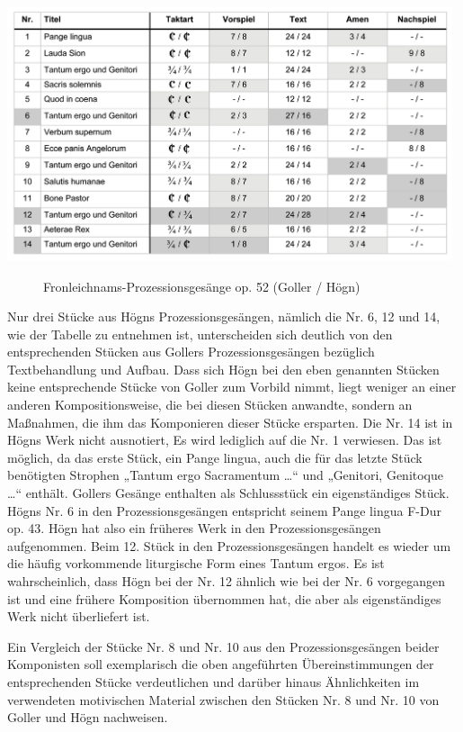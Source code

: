 {%
\includegraphics[width=13.088cm,height=7.486cm]{pictures/zulassungsarbeit-img082.png}
 \par}

\begin{figure}
\caption{Fronleichnams-Prozessionsgesänge op. 52 (Goller / Högn)}
\end{figure}

Nur drei Stücke aus Högns Prozessionsgesängen, nämlich die Nr. 6, 12 und
14, wie der Tabelle zu entnehmen ist, unterscheiden sich deutlich von
den entsprechenden Stücken aus Gollers Prozessionsgesängen bezüglich
Textbehandlung und Aufbau. Dass sich Högn bei den eben genannten
Stücken keine entsprechende Stücke von Goller zum Vorbild nimmt, liegt
weniger an einer anderen Kompositionsweise, die bei diesen Stücken
anwandte, sondern an Maßnahmen, die ihm das Komponieren dieser Stücke
ersparten. Die Nr. 14 ist in Högns Werk nicht ausnotiert, Es wird
lediglich auf die Nr. 1 verwiesen. Das ist möglich, da das erste Stück,
ein Pange lingua, auch die für das letzte Stück benötigten Strophen
„Tantum ergo Sacramentum …“ und „Genitori, Genitoque …“ enthält.
Gollers Gesänge enthalten als Schlussstück ein eigenständiges Stück.
Högns Nr. 6 in den Prozessionsgesängen entspricht seinem Pange lingua
F-Dur op. 43. Högn hat also ein früheres Werk in den
Prozessionsgesängen aufgenommen. Beim 12. Stück in den
Prozessionsgesängen handelt es wieder um die häufig vorkommende
liturgische Form eines Tantum ergos. Es ist wahrscheinlich, dass Högn
bei der Nr. 12 ähnlich wie bei der Nr. 6 vorgegangen ist und eine
frühere Komposition übernommen hat, die aber als eigenständiges Werk
nicht überliefert ist.

Ein Vergleich der Stücke Nr. 8 und Nr. 10 aus den Prozessionsgesängen
beider Komponisten soll exemplarisch die oben angeführten
Übereinstimmungen der entsprechenden Stücke verdeutlichen und darüber
hinaus Ähnlichkeiten im verwendeten motivischen Material zwischen den
Stücken Nr. 8 und Nr. 10 von Goller und Högn nachweisen.


